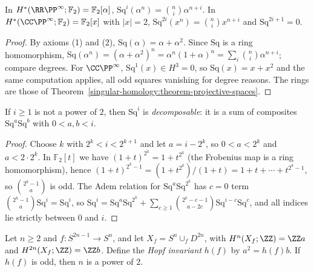 \begin{proposition}\label{cohomology-operations:proposition-squares-projective}
In $H^*(\RR\PP^\infty; \mathbb{F}_2) = \mathbb{F}_2[\alpha]$, $\mathrm{Sq}^i(\alpha^n) = \binom{n}{i}\alpha^{n+i}$. In $H^*(\CC\PP^\infty; \mathbb{F}_2) = \mathbb{F}_2[x]$ with $|x| = 2$,
$\mathrm{Sq}^{2i}(x^n) = \binom{n}{i}x^{n+i}$ and $\mathrm{Sq}^{2i+1} = 0$.
\end{proposition}

\begin{proof}
By axioms (1) and (2), $\mathrm{Sq}(\alpha) = \alpha + \alpha^2$. Since $\mathrm{Sq}$ is a ring homomorphism,
$\mathrm{Sq}(\alpha^n) = (\alpha + \alpha^2)^n = \alpha^n(1 + \alpha)^n = \sum_i \binom{n}{i}\alpha^{n+i}$; compare degrees. For $\CC\PP^\infty$, $\mathrm{Sq}^1(x) \in H^3 = 0$, so
$\mathrm{Sq}(x) = x + x^2$ and the same computation applies, all odd squares vanishing for degree reasons. The rings are those of
Theorem~\ref{singular-homology:theorem-projective-spaces}.
\end{proof}

\begin{lemma}\label{cohomology-operations:lemma-decomposable}
If $i \geq 1$ is not a power of $2$, then $\mathrm{Sq}^i$ is \emph{decomposable}: it is a sum of composites $\mathrm{Sq}^a\mathrm{Sq}^b$ with $0 < a, b < i$.
\end{lemma}

\begin{proof}
Choose $k$ with $2^k < i < 2^{k+1}$ and let $a = i - 2^k$, so $0 < a < 2^k$ and $a < 2 \cdot 2^k$. In $\mathbb{F}_2[t]$ we have $(1 + t)^{2^k} = 1 + t^{2^k}$ (the Frobenius map is a
ring homomorphism), hence $(1 + t)^{2^k - 1} = (1 + t^{2^k})/(1 + t) = 1 + t + \cdots + t^{2^k - 1}$, so $\binom{2^k - 1}{a}$ is odd. The Adem relation for $\mathrm{Sq}^a\mathrm{Sq}^{2^k}$
has $c = 0$ term $\binom{2^k - 1}{a}\mathrm{Sq}^i = \mathrm{Sq}^i$, so $\mathrm{Sq}^i = \mathrm{Sq}^a\mathrm{Sq}^{2^k} + \sum_{c \geq 1}\binom{2^k - c - 1}{a - 2c}\mathrm{Sq}^{i-c}\mathrm{Sq}^c$, and all indices
lie strictly between $0$ and $i$.
\end{proof}

\begin{corollary}\label{cohomology-operations:corollary-hopf-invariant}
Let $n \geq 2$ and $f \colon S^{2n-1} \to S^n$, and let $X_f = S^n \cup_f D^{2n}$, with $H^n(X_f; \ZZ) = \ZZ a$ and $H^{2n}(X_f; \ZZ) = \ZZ b$. Define the \emph{Hopf invariant} $h(f)$ by
$a^2 = h(f)b$. If $h(f)$ is odd, then $n$ is a power of $2$.
\end{corollary}

